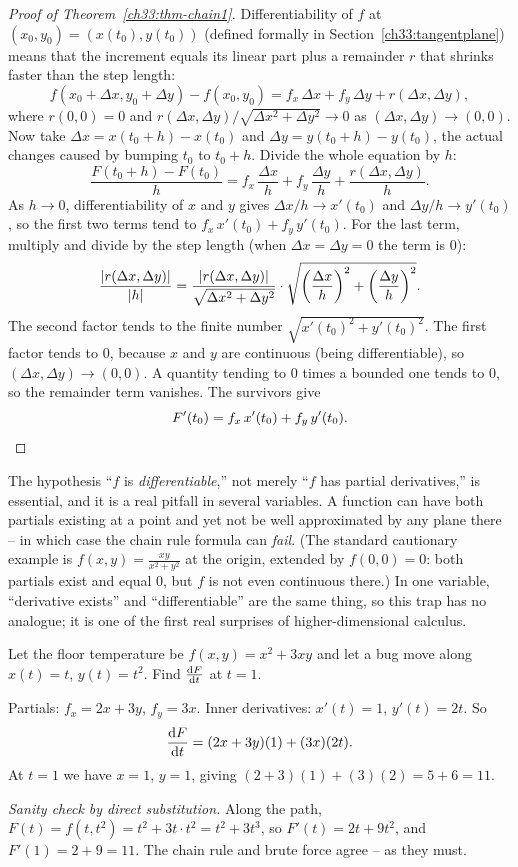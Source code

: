 \begin{proof}[Proof of Theorem~\ref{ch33:thm-chain1}]
Differentiability of $f$ at $(x_0,y_0)=(x(t_0),y(t_0))$ (defined formally in
Section~\ref{ch33:tangentplane}) means that the increment equals its linear part
plus a remainder $r$ that shrinks faster than the step length:
\[
  f(x_0+\Delta x, y_0+\Delta y) - f(x_0,y_0)
  = f_x\,\Delta x + f_y\,\Delta y + r(\Delta x,\Delta y),
\]
where $r(0,0)=0$ and $r(\Delta x,\Delta y)/\sqrt{\Delta x^2+\Delta y^2}\to 0$ as
$(\Delta x,\Delta y)\to(0,0)$. Now take
$\Delta x = x(t_0+h)-x(t_0)$ and $\Delta y = y(t_0+h)-y(t_0)$, the actual changes
caused by bumping $t_0$ to $t_0+h$. Divide the whole equation by $h$:
\[
  \frac{F(t_0+h)-F(t_0)}{h}
  = f_x\,\frac{\Delta x}{h} + f_y\,\frac{\Delta y}{h}
   + \frac{r(\Delta x,\Delta y)}{h}.
\]
As $h\to 0$, differentiability of $x$ and $y$ gives
$\Delta x/h \to x'(t_0)$ and $\Delta y/h \to y'(t_0)$, so the first two terms
tend to $f_x\,x'(t_0)+f_y\,y'(t_0)$. For the last term, multiply and divide by the
step length (when $\Delta x=\Delta y=0$ the term is $0$):
\[
  \frac{\lvert r(\Delta x,\Delta y)\rvert}{\lvert h\rvert}
  = \frac{\lvert r(\Delta x,\Delta y)\rvert}{\sqrt{\Delta x^2+\Delta y^2}}
    \cdot\sqrt{\left(\frac{\Delta x}{h}\right)^{2}+\left(\frac{\Delta y}{h}\right)^{2}}.
\]
The second factor tends to the finite number $\sqrt{x'(t_0)^2+y'(t_0)^2}$. The
first factor tends to $0$, because $x$ and $y$ are continuous (being
differentiable), so $(\Delta x,\Delta y)\to(0,0)$. A quantity tending to $0$ times
a bounded one tends to $0$, so the remainder term vanishes. The survivors give
\[
  F'(t_0) = f_x\,x'(t_0) + f_y\,y'(t_0). \qedhere
\]
\end{proof}

\begin{trapbox}
The hypothesis ``$f$ is \emph{differentiable},'' not merely ``$f$ has partial
derivatives,'' is essential, and it is a real pitfall in several variables. A
function can have both partials existing at a point and yet not be well
approximated by any plane there -- in which case the chain rule formula can
\emph{fail}. (The standard cautionary example is $f(x,y)=\tfrac{xy}{x^2+y^2}$ at
the origin, extended by $f(0,0)=0$: both partials exist and equal $0$, but $f$ is
not even continuous there.) In one variable, ``derivative exists'' and
``differentiable'' are the same thing, so this trap has no analogue; it is one of
the first real surprises of higher-dimensional calculus.
\end{trapbox}

\begin{example}
\label{ch33:ex-bug}
Let the floor temperature be $f(x,y)=x^2 + 3xy$ and let a bug move along
$x(t)=t$, $y(t)=t^2$. Find $\frac{\mathrm{d} F}{\mathrm{d} t}$ at $t=1$.

Partials: $f_x = 2x+3y$, $f_y=3x$. Inner derivatives: $x'(t)=1$, $y'(t)=2t$. So
\[
  \frac{\mathrm{d} F}{\mathrm{d} t} = (2x+3y)(1) + (3x)(2t).
\]
At $t=1$ we have $x=1$, $y=1$, giving $(2+3)(1) + (3)(2) = 5 + 6 = 11$.

\emph{Sanity check by direct substitution.} Along the path,
$F(t)=f(t,t^2)=t^2 + 3t\cdot t^2 = t^2 + 3t^3$, so $F'(t)=2t+9t^2$, and
$F'(1)=2+9=11$. The chain rule and brute force agree -- as they must.
\end{example}

